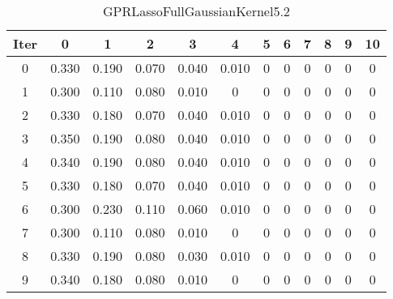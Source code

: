 \begin{table}
	\begin{center}
		\begin{tabular}{|c|c|c|c|c|c|c|c|c|c|c|c|}
			\hline
			Iter & 0 & 1 & 2 & 3 & 4 & 5 & 6 & 7 & 8 & 9 & 10 \\
			\hline
			0 & 0.330 & 0.190 & 0.070 & 0.040 & 0.010 & 0 & 0 & 0 & 0 & 0 & 0 \\
			\hline
			1 & 0.300 & 0.110 & 0.080 & 0.010 & 0 & 0 & 0 & 0 & 0 & 0 & 0 \\
			\hline
			2 & 0.330 & 0.180 & 0.070 & 0.040 & 0.010 & 0 & 0 & 0 & 0 & 0 & 0 \\
			\hline
			3 & 0.350 & 0.190 & 0.080 & 0.040 & 0.010 & 0 & 0 & 0 & 0 & 0 & 0 \\
			\hline
			4 & 0.340 & 0.190 & 0.080 & 0.040 & 0.010 & 0 & 0 & 0 & 0 & 0 & 0 \\
			\hline
			5 & 0.330 & 0.180 & 0.070 & 0.040 & 0.010 & 0 & 0 & 0 & 0 & 0 & 0 \\
			\hline
			6 & 0.300 & 0.230 & 0.110 & 0.060 & 0.010 & 0 & 0 & 0 & 0 & 0 & 0 \\
			\hline
			7 & 0.300 & 0.110 & 0.080 & 0.010 & 0 & 0 & 0 & 0 & 0 & 0 & 0 \\
			\hline
			8 & 0.330 & 0.190 & 0.080 & 0.030 & 0.010 & 0 & 0 & 0 & 0 & 0 & 0 \\
			\hline
			9 & 0.340 & 0.180 & 0.080 & 0.010 & 0 & 0 & 0 & 0 & 0 & 0 & 0 \\
			\hline
		\end{tabular}
	\end{center}
	\caption{GPRLassoFullGaussianKernel5.2}
\end{table}